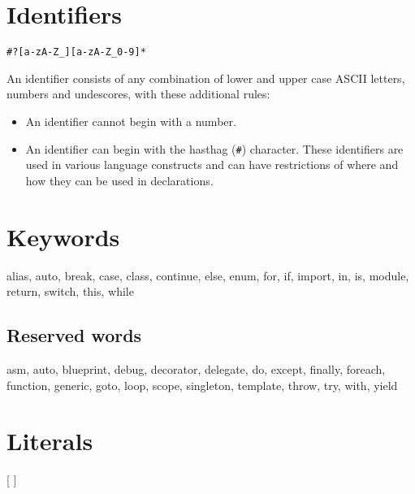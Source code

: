 \section{Identifiers}
\begin{grammar}
	 \verb|#?[a-zA-Z_][a-zA-Z_0-9]*|
\end{grammar}
An identifier consists of any combination of lower and upper case ASCII letters, numbers and undescores, with these additional rules:
\begin{itemize}
	\item An identifier cannot begin with a number.
	\item An identifier can begin with the hasthag (\verb|#|) character. These identifiers are used in various language constructs and can have restrictions of where and how they can be used in declarations.
\end{itemize}

\section{Keywords} \label{keywords}
\begin{code}
alias, auto, break, case, class, continue, else, enum, for, if, import, in, is, module, return, switch, this, while
\end{code}

\subsection{Reserved words}
\begin{code}
asm, auto, blueprint, debug, decorator, delegate, do, except, finally, foreach, function, generic, goto, loop, scope, singleton, template, throw, try, with, yield
\end{code}

\section{Literals}
\begin{grammar}
	  [  ] \\
	  \\
		\grAltLn {} \\
		\grAltLn {} \\
		\grAltLn {} \\
		\grAltLn {} \\
		\grAltLn {} \\
\end{grammar}

